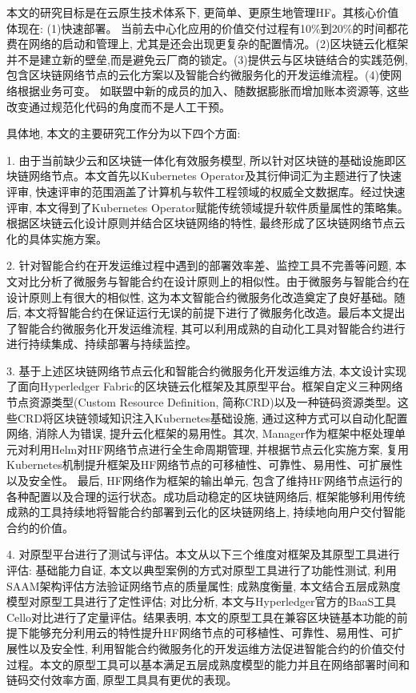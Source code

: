 
本文的研究目标是在云原生技术体系下, 更简单、更原生地管理HF。其核心价值体现在: (1)快速部署。 当前去中心化应用的价值交付过程有10\%到20\%的时间都花费在网络的启动和管理上, 尤其是还会出现更复杂的配置情况。(2)区块链云化框架并不是建立新的壁垒,而是避免云厂商的锁定。(3)提供云与区块链结合的实践范例, 包含区块链网络节点的云化方案以及智能合约微服务化的开发运维流程。(4)使网络根据业务可变。
如联盟中新的成员的加入、随数据膨胀而增加账本资源等, 这些改变通过规范化代码的角度而不是人工干预。

具体地, 本文的主要研究工作分为以下四个方面: 

1. 由于当前缺少云和区块链一体化有效服务模型, 所以针对区块链的基础设施即区块链网络节点。本文首先以Kubernetes Operator及其衍伸词汇为主题进行了快速评审, 快速评审的范围涵盖了计算机与软件工程领域的权威全文数据库。经过快速评审, 本文得到了Kubernetes Operator赋能传统领域提升软件质量属性的策略集。根据区块链云化设计原则并结合区块链网络的特性, 最终形成了区块链网络节点云化的具体实施方案。

2. 针对智能合约在开发运维过程中遇到的部署效率差、监控工具不完善等问题, 本文对比分析了微服务与智能合约在设计原则上的相似性。由于微服务与智能合约在设计原则上有很大的相似性, 这为本文智能合约微服务化改造奠定了良好基础。随后, 本文将智能合约在保证运行无误的前提下进行了微服务化改造。最后本文提出了智能合约微服务化开发运维流程, 其可以利用成熟的自动化工具对智能合约进行进行持续集成、持续部署与持续监控。

3. 基于上述区块链网络节点云化和智能合约微服务化开发运维方法, 本文设计实现了面向Hyperledger Fabric的区块链云化框架及其原型平台。框架自定义三种网络节点资源类型(Custom Resource Definition, 简称CRD)以及一种链码资源类型。这些CRD将区块链领域知识注入Kubernetes基础设施, 通过这种方式可以自动化配置网络, 消除人为错误, 提升云化框架的易用性。其次, Manager作为框架中枢处理单元对利用Helm对HF网络节点进行全生命周期管理, 并根据节点云化实施方案, 复用Kubernetes机制提升框架及HF网络节点的可移植性、可靠性、易用性、可扩展性以及安全性。
最后, HF网络作为框架的输出单元, 包含了维持HF网络节点运行的各种配置以及合理的运行状态。成功启动稳定的区块链网络后, 框架能够利用传统成熟的工具持续地将智能合约部署到云化的区块链网络上, 持续地向用户交付智能合约的价值。

4. 对原型平台进行了测试与评估。本文从以下三个维度对框架及其原型工具进行评估: 基础能力自证, 本文以典型案例的方式对原型工具进行了功能性测试, 利用SAAM架构评估方法验证网络节点的质量属性; 成熟度衡量, 本文结合五层成熟度模型对原型工具进行了定性评估; 对比分析, 本文与Hyperledger官方的BaaS工具Cello对比进行了定量评估。结果表明, 本文的原型工具在兼容区块链基本功能的前提下能够充分利用云的特性提升HF网络节点的可移植性、可靠性、易用性、可扩展性以及安全性, 利用智能合约微服务化的开发运维方法促进智能合约的价值交付过程。本文的原型工具可以基本满足五层成熟度模型的能力并且在网络部署时间和链码交付效率方面, 原型工具具有更优的表现。

